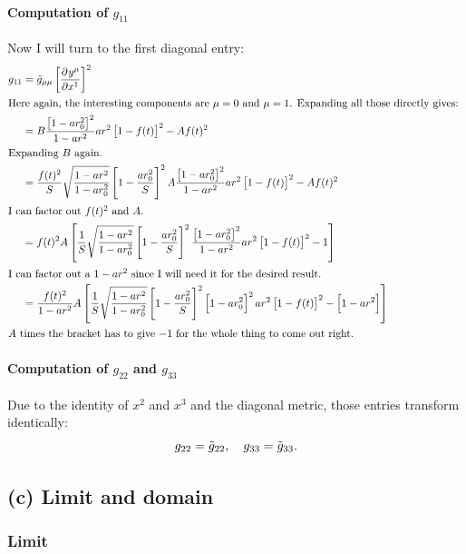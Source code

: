 \paragraph{Computation of $g_{11}$}

Now I will turn to the first diagonal entry:
\begin{align*}
    g_{11}
    &= \tilde g_{\mu\mu} \sbr{\dpd{{y^\mu}}{{x^1}}}^2 \\
    \intertext{%
        Here again, the interesting components are $\mu = 0$ and $\mu = 1$.
        Expanding all those directly gives:
    }
    &= B \frac{\sbr{1 - ar_0^2}^2}{1 - ar^2} ar^2 \sbr{1 - f(t)}^2 - A f(t)^2
    \\
    \intertext{%
        Expanding $B$ again.
    }
    &= \frac{f(t)^2}S \WW \sbr{1 - \frac{ar_0^2}S}^2 A \frac{\sbr{1 -
    ar_0^2}^2}{1 - ar^2} ar^2 \sbr{1 - f(t)}^2 - A f(t)^2 \\
    \intertext{%
        I can factor out $f(t)^2$ and $A$.
    }
    &= f(t)^2 A \sbr{ \frac{1}S \WW \sbr{1 - \frac{ar_0^2}S}^2 \frac{\sbr{1 -
    ar_0^2}^2}{1 - ar^2} ar^2 \sbr{1 - f(t)}^2 - 1} \\
    \intertext{%
        I can factor out a $1 - ar^2$ since I will need it for the desired
        result.
    }
    &= \frac{f(t)^2}{1 - ar^2} A \sbr{ \frac{1}S \WW \sbr{1 - \frac{ar_0^2}S}^2
    \sbr{1 - ar_0^2}^2 ar^2 \sbr{1 - f(t)}^2 - \sbr{1 - ar^2}} \\
    \intertext{%
        $A$ times the bracket has to give $-1$ for the whole thing to come out
        right.
    }
\end{align*}

\paragraph{Computation of $g_{22}$ and $g_{33}$}

Due to the identity of $x^2$ and $x^3$ and the diagonal metric, those entries
transform identically:
\[
    g_{22} = \tilde g_{22}
    ,\quad
    g_{33} = \tilde g_{33}.
\]


\subsection*{(c) Limit and domain}

\subsubsection*{Limit}

